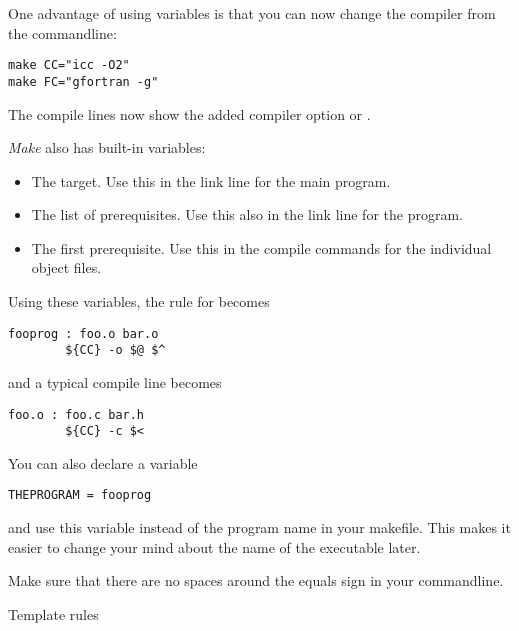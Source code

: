 One
advantage of using variables is that you can now change the compiler
from the commandline:
\begin{verbatim}
make CC="icc -O2"
make FC="gfortran -g"
\end{verbatim}

  {The compile lines now show the added compiler option  or .}{}

\emph{Make} also has built-in variables:
\begin{itemize}
\item [\n{\$@}] The target. Use this in the link line for the main
  program. %
\item [\n{\$\char`\^}] The list of prerequisites. Use this also in the link
  line for the program.
\item [\n{\$<}] The first prerequisite. Use this in the compile
  commands for the individual object files.
\end{itemize}
Using these variables, the rule for  becomes
\begin{verbatim}
fooprog : foo.o bar.o
        ${CC} -o $@ $^
\end{verbatim}
and a typical compile line becomes
\begin{verbatim}
foo.o : foo.c bar.h
        ${CC} -c $<
\end{verbatim}

You can also declare a variable
\begin{verbatim}
THEPROGRAM = fooprog
\end{verbatim}
and use this variable instead of the program name in your
makefile. This makes it easier to change your mind about the name of
the executable later. 

  {Make sure that there are no spaces around the equals sign in your
    commandline.}

 {Template rules}

